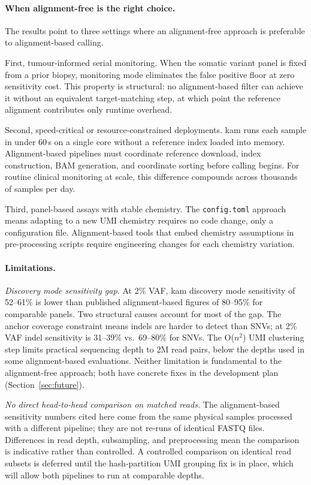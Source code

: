 \paragraph{When alignment-free is the right choice.}
The results point to three settings where an alignment-free approach is
preferable to alignment-based calling.

First, tumour-informed serial monitoring.
When the somatic variant panel is fixed from a prior biopsy, monitoring mode
eliminates the false positive floor at zero sensitivity cost.
This property is structural: no alignment-based filter can achieve it without
an equivalent target-matching step, at which point the reference alignment
contributes only runtime overhead.

Second, speed-critical or resource-constrained deployments.
kam runs each sample in under 60\,s on a single core without a reference
index loaded into memory.
Alignment-based pipelines must coordinate reference download, index
construction, BAM generation, and coordinate sorting before calling begins.
For routine clinical monitoring at scale, this difference compounds across
thousands of samples per day.

Third, panel-based assays with stable chemistry.
The \texttt{config.toml} approach means adapting to a new UMI chemistry
requires no code change, only a configuration file.
Alignment-based tools that embed chemistry assumptions in pre-processing
scripts require engineering changes for each chemistry variation.

\paragraph{Limitations.}

\textit{Discovery mode sensitivity gap.}
At 2\% VAF, kam discovery mode sensitivity of 52--61\% is lower than
published alignment-based figures of 80--95\% for comparable panels.
Two structural causes account for most of the gap.
The anchor coverage constraint means indels are harder to detect than SNVs;
at 2\% VAF indel sensitivity is 31--39\% vs.\ 69--80\% for SNVs.
The O($n^2$) UMI clustering step limits practical sequencing depth to 2M
read pairs, below the depths used in some alignment-based evaluations.
Neither limitation is fundamental to the alignment-free approach; both have
concrete fixes in the development plan (Section~\ref{sec:future}).

\textit{No direct head-to-head comparison on matched reads.}
The alignment-based sensitivity numbers cited here come from the same physical
samples processed with a different pipeline; they are not re-runs of identical
FASTQ files.
Differences in read depth, subsampling, and preprocessing mean the comparison
is indicative rather than controlled.
A controlled comparison on identical read subsets is deferred until the
hash-partition UMI grouping fix is in place, which will allow both pipelines
to run at comparable depths.

